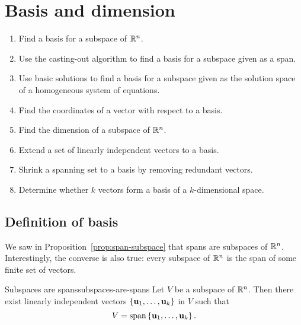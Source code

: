 \section{Basis and dimension}
\label{sec:basis-and-dimension}

\begin{outcome}
  \begin{enumerate}\setlength\itemsep{0em}
  \item Find a basis for a subspace of $\mathbb{R}^n$.
  \item Use the casting-out algorithm to find a basis for a subspace
    given as a span.
  \item Use basic solutions to find a basis for a subspace given as
    the solution space of a homogeneous system of equations.
  \item Find the coordinates of a vector with respect to a basis.
  \item Find the dimension of a subspace of $\mathbb{R}^n$.
  \item Extend a set of linearly independent vectors to a basis.
  \item Shrink a spanning set to a basis by removing redundant vectors.
  \item Determine whether $k$ vectors form a basis of a $k$-dimensional
    space.
  \end{enumerate}
\end{outcome}

\subsection{Definition of basis}

We saw in Proposition~\ref{prop:span-subspace} that spans are
subspaces of\/ $\mathbb{R}^n$. Interestingly, the converse is also true: every
subspace of\/ $\mathbb{R}^n$ is the span of some finite set of vectors.

\begin{theorem}{Subspaces are spans}{subspaces-are-spans}
  Let $V$ be a subspace of\/ $\mathbb{R}^n$. Then there exist linearly
  independent vectors $\set{\vect{u}_{1},\ldots,\vect{u}_{k}}$ in $V$
  such that
  \begin{equation*}
    V= \sspan\set{\vect{u}_{1},\ldots ,\vect{u}_{k}}.
  \end{equation*}
  \vspace{-3ex}
\end{theorem}

